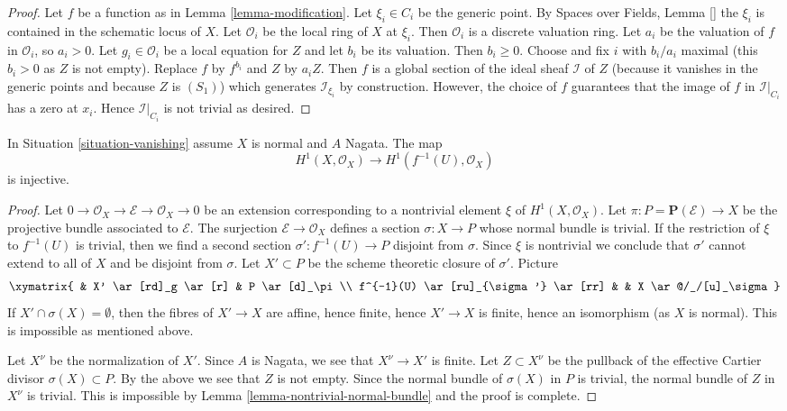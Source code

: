 \begin{proof}
Let $f$ be a function as in Lemma \ref{lemma-modification}.
Let $\xi_i \in C_i$ be the generic point. By Spaces over Fields, Lemma \ref{}
the $\xi_i$ is contained in the schematic locus of $X$. Let
$\mathcal{O}_i$ be the local ring of $X$ at $\xi_i$. Then $\mathcal{O}_i$
is a discrete valuation ring. Let $a_i$ be the valuation of
$f$ in $\mathcal{O}_i$, so $a_i > 0$. Let $g_i \in \mathcal{O}_i$ be a local
equation for $Z$ and let $b_i$ be its valuation. Then $b_i \geq 0$.
Choose and fix $i$ with $b_i/a_i$ maximal (this $b_i > 0$ as
$Z$ is not empty). Replace $f$ by $f^{b_i}$ and $Z$ by $a_iZ$.
Then $f$ is a global section of the ideal sheaf $\mathcal{I}$
of $Z$ (because it vanishes in the generic points and because
$Z$ is $(S_1)$) which generates $\mathcal{I}_{\xi_i}$ by construction.
However, the choice of $f$ guarantees that the image of $f$ in
$\mathcal{I}|_{C_i}$ has a zero at $x_i$. Hence $\mathcal{I}|_{C_i}$
is not trivial as desired.
\end{proof}

\begin{lemma}
\label{lemma-H1-injective}
In Situation \ref{situation-vanishing} assume $X$ is normal
and $A$ Nagata. The map
$$
H^1(X, \mathcal{O}_X) \longrightarrow H^1(f^{-1}(U), \mathcal{O}_X)
$$
is injective.
\end{lemma}

\begin{proof}
Let $0 \to \mathcal{O}_X \to \mathcal{E} \to \mathcal{O}_X \to 0$ be an
extension corresponding to a nontrivial element $\xi$ of
$H^1(X, \mathcal{O}_X)$. Let $\pi : P = \mathbf{P}(\mathcal{E}) \to X$
be the projective bundle associated to $\mathcal{E}$.
The surjection $\mathcal{E} \to \mathcal{O}_X$
defines a section $\sigma : X \to P$ whose normal bundle is trivial.
If the restriction of $\xi$ to $f^{-1}(U)$ is trivial, then we
find a second section $\sigma' : f^{-1}(U) \to P$ disjoint from $\sigma$.
Since $\xi$ is nontrivial we conclude that $\sigma'$ cannot extend
to all of $X$ and be disjoint from $\sigma$. Let $X' \subset P$ be the
scheme theoretic closure of $\sigma'$. Picture
$$
\xymatrix{
& X' \ar[rd]_g \ar[r] & P \ar[d]_\pi \\
f^{-1}(U) \ar[ru]_{\sigma'} \ar[rr] & & X \ar@/_/[u]_\sigma
}
$$
If $X' \cap \sigma(X) = \emptyset$, then the fibres of $X' \to X$
are affine, hence finite, hence $X' \to X$ is finite, hence an isomorphism
(as $X$ is normal). This is impossible as mentioned above.

\medskip\noindent
Let $X^\nu$ be the normalization of $X'$. Since $A$ is Nagata, we see
that $X^\nu \to X'$ is finite. Let $Z \subset X^\nu$ be the pullback
of the effective Cartier divisor $\sigma(X) \subset P$. By the above
we see that $Z$ is not empty. Since the normal
bundle of $\sigma(X)$ in $P$ is trivial, the normal bundle of $Z$
in $X^\nu$ is trivial. This is impossible by
Lemma \ref{lemma-nontrivial-normal-bundle}
and the proof is complete.
\end{proof}

